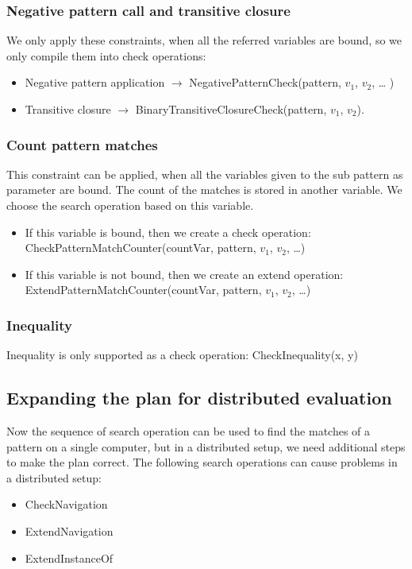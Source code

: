 \subsubsection{Negative pattern call and transitive closure}

We only apply these constraints, when all the referred variables are bound, so we only compile them into check operations:
\begin{itemize}
	\item Negative pattern application $\rightarrow{}$ NegativePatternCheck(pattern, $v_1$, $v_2$, \dots{} )
	\item Transitive closure $\rightarrow{}$ BinaryTransitiveClosureCheck(pattern, $v_1$, $v_2$).
\end{itemize}

\subsubsection{Count pattern matches}

This constraint can be applied, when all the variables given to the sub pattern as parameter are bound. 
The count of the matches is stored in another variable. 
We choose the search operation based on this variable.

\begin{itemize}
	\item If this variable is bound, then we create a check operation: 
	CheckPatternMatchCounter(countVar, pattern, $v_1$, $v_2$, \dots{})
	\item If this variable is not bound, then we create an extend operation: 
	ExtendPatternMatchCounter(countVar, pattern, $v_1$, $v_2$, \dots{})
\end{itemize}


\subsubsection{Inequality}
Inequality is only supported as a check operation: CheckInequality(x, y)


\subsection{Expanding the plan for distributed evaluation}
Now the sequence of search operation can be used to find the matches of a pattern on a single computer, but in a distributed setup, we need additional steps to make the plan correct.
The following search operations can cause problems in a distributed setup:
\begin{itemize}
	\item CheckNavigation	
	\item ExtendNavigation
	\item ExtendInstanceOf
\end{itemize}

